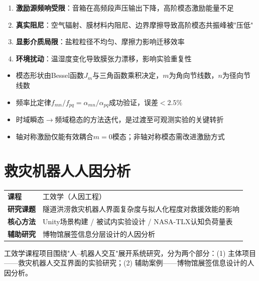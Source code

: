 \documentclass[12pt,a4paper]{ctexart}
\begin{document}
\begin{enumerate}
    \item \textbf{激励源频响受限}：音箱在高频段声压输出下降，高阶模态激励能量不足
    \item \textbf{真实阻尼}：空气辐射、膜材料内阻尼、边界摩擦导致高阶模态共振峰被"压低"
    \item \textbf{显影介质局限}：盐粒粒径不均匀、摩擦力影响迁移效率
    \item \textbf{环境扰动}：温湿度变化导致膜张力漂移，影响实验重复性
\end{enumerate}

\begin{resultbox}[核心结论]
\begin{itemize}
    \item 模态形状由Bessel函数$J_m$与三角函数乘积决定，$m$为角向节线数，$n$为径向节线数
    \item 频率比定律$f_{mn}/f_{pq} = \alpha_{mn}/\alpha_{pq}$成功验证，误差$<$$2.5\%$
    \item 时域瞬态$\to$频域稳态的方法迭代，是过渡至可观测实验的关键转折
    \item 轴对称激励仅能有效耦合$m=0$模态；非轴对称模态需改进激励方式
\end{itemize}
\end{resultbox}

\newpage
\section{救灾机器人人因分析}

\begin{infobox}[项目概况]
\begin{tabular}{ll}
\textbf{课程} & 工效学（人因工程） \\
\textbf{研究课题} & 隧道洪涝救灾机器人界面复杂度与拟人化程度对救援效能的影响 \\
\textbf{核心方法} & Unity场景构建 / 被试内实验设计 / NASA-TLX认知负荷量表 \\
\textbf{辅助研究} & 博物馆展签信息分层设计的人因分析
\end{tabular}
\end{infobox}

工效学课程项目围绕"人--机器人交互"展开系统研究，分为两个部分：(1) 主体项目——救灾机器人交互界面的实验研究；(2) 辅助案例——博物馆展签信息设计的人因分析。
\end{document}
